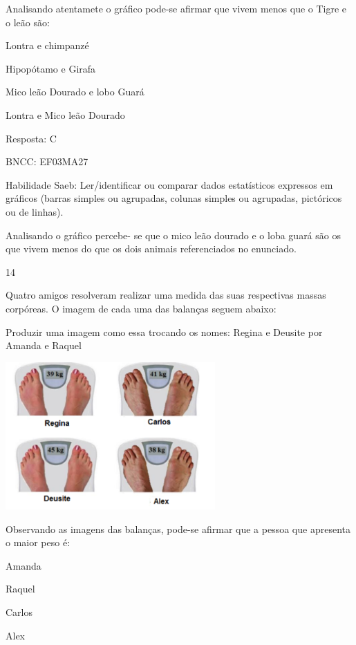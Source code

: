 \begin{escolha}
{\begin{escolha}
{Analisando atentamete o gráfico pode-se afirmar que vivem menos que o
Tigre e o leão são:

\begin{escolha}

\item
  Lontra e chimpanzé
\item
  Hipopótamo e Girafa
\item
  Mico leão Dourado e lobo Guará
\item
  Lontra e Mico leão Dourado
\end{escolha}

Resposta: C

BNCC: EF03MA27

Habilidade Saeb: Ler/identificar ou comparar dados estatísticos
expressos em gráficos (barras simples ou agrupadas, colunas simples ou
agrupadas, pictóricos ou de linhas).

Analisando o gráfico percebe- se que o mico leão dourado e o loba guará
são os que vivem menos do que os dois animais referenciados no
enunciado.

\num{14}

Quatro amigos resolveram realizar uma medida das suas respectivas massas
corpóreas. O imagem de cada uma das balanças seguem abaixo:

Produzir uma imagem como essa trocando os nomes: Regina e Deusite por
Amanda e Raquel

\includegraphics[width=3.15196in,height=2.22201in]{media/image128.png}

Observando as imagens das balanças, pode-se afirmar que a pessoa que
apresenta o maior peso é:

\begin{escolha}

\item
  Amanda
\item
  Raquel
\item
  Carlos
\item
  Alex
\end{escolha}

}
\end{escolha}}
\end{escolha}
